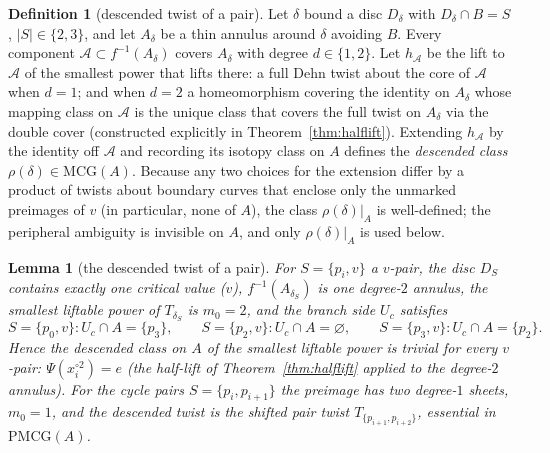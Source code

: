 \documentclass[11pt]{article}
\newtheorem{lemma}[theorem]{Lemma}
\theoremstyle{definition}
\newtheorem{definition}[theorem]{Definition}
\theoremstyle{remark}
\newcommand{\PMCG}{\mathrm{PMCG}}
\newcommand{\MCG}{\mathrm{MCG}}
\begin{document}
\begin{definition}[descended twist of a pair]\label{def:descend}
Let $\delta$ bound a disc $D_\delta$ with
$D_\delta\cap B=S$, $|S|\in\{2,3\}$, and let $A_\delta$ be a thin
annulus around $\delta$ avoiding $B$.  Every component
$\mathscr A\subset f^{-1}(A_\delta)$ covers $A_\delta$ with degree
$d\in\{1,2\}$.  Let $h_{\mathscr A}$ be the lift to $\mathscr A$ of the
smallest power that lifts there: a full Dehn twist about the core of
$\mathscr A$ when $d=1$; and when $d=2$ a homeomorphism covering the
identity on $A_\delta$ whose mapping class on $\mathscr A$ is the
unique class that covers the full twist on $A_\delta$ via the double
cover (constructed explicitly in Theorem~\ref{thm:halflift}).
Extending $h_{\mathscr A}$ by the identity off $\mathscr A$ and
recording its isotopy class on $A$ defines the \emph{descended class}
$\rho(\delta)\in\MCG(A)$.  Because any two choices for the extension
differ by a product of twists about boundary curves that enclose only
the unmarked preimages of $v$ \textup{(}in particular, none of
$A$\textup{)}, the class $\rho(\delta)|_A$ is well-defined; the
peripheral ambiguity is invisible on $A$, and only $\rho(\delta)|_A$
is used below.
\end{definition}

\begin{lemma}[the descended twist of a pair]\label{lem:descend}
For $S=\{p_i,v\}$ a $v$-pair, the disc $D_S$ contains exactly one
critical value \textup{(}$v$\textup{)}, $f^{-1}(A_{\delta_S})$ is one
degree-$2$ annulus, the smallest liftable power of $T_{\delta_S}$ is
$m_0=2$, and the branch side $U_c$ satisfies
\[
S=\{p_0,v\}:U_c\cap A=\{p_3\},\qquad
S=\{p_2,v\}:U_c\cap A=\varnothing,\qquad
S=\{p_3,v\}:U_c\cap A=\{p_2\}.
\]
Hence the descended class on $A$ of the smallest liftable power is
trivial for every $v$-pair: $\Psi(x_i^{\circ2})=e$ (the half-lift of
Theorem~\ref{thm:halflift} applied to the degree-$2$ annulus).
For the cycle pairs $S=\{p_i,p_{i+1}\}$ the preimage has two
degree-$1$ sheets, $m_0=1$, and the descended twist is the shifted pair
twist $T_{\{p_{i+1},p_{i+2}\}}$, essential in $\PMCG(A)$.
\end{lemma}
\end{document}
